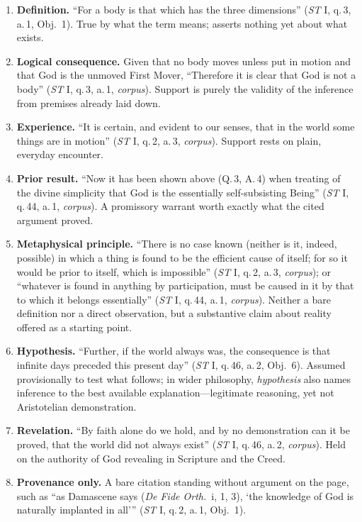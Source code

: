 \begin{enumerate}
\item \textbf{Definition.} ``For a body is that which has the three dimensions'' (\emph{ST} I, q.\,3, a.\,1, Obj.\ 1). True by what the term means; asserts nothing yet about what exists.
\item \textbf{Logical consequence.} Given that no body moves unless put in motion and that God is the unmoved First Mover, ``Therefore it is clear that God is not a body'' (\emph{ST} I, q.\,3, a.\,1, \emph{corpus}). Support is purely the validity of the inference from premises already laid down.
\item \textbf{Experience.} ``It is certain, and evident to our senses, that in the world some things are in motion'' (\emph{ST} I, q.\,2, a.\,3, \emph{corpus}). Support rests on plain, everyday encounter.
\item \textbf{Prior result.} ``Now it has been shown above (Q.\,3, A.\,4) when treating of the divine simplicity that God is the essentially self-subsisting Being'' (\emph{ST} I, q.\,44, a.\,1, \emph{corpus}). A promissory warrant worth exactly what the cited argument proved.
\item \textbf{Metaphysical principle.} ``There is no case known (neither is it, indeed, possible) in which a thing is found to be the efficient cause of itself; for so it would be prior to itself, which is impossible'' (\emph{ST} I, q.\,2, a.\,3, \emph{corpus}); or ``whatever is found in anything by participation, must be caused in it by that to which it belongs essentially'' (\emph{ST} I, q.\,44, a.\,1, \emph{corpus}). Neither a bare definition nor a direct observation, but a substantive claim about reality offered as a starting point.
\item \textbf{Hypothesis.} ``Further, if the world always was, the consequence is that infinite days preceded this present day'' (\emph{ST} I, q.\,46, a.\,2, Obj.\ 6). Assumed provisionally to test what follows; in wider philosophy, \emph{hypothesis} also names inference to the best available explanation---legitimate reasoning, yet not Aristotelian demonstration.
\item \textbf{Revelation.} ``By faith alone do we hold, and by no demonstration can it be proved, that the world did not always exist'' (\emph{ST} I, q.\,46, a.\,2, \emph{corpus}). Held on the authority of God revealing in Scripture and the Creed.
\item \textbf{Provenance only.} A bare citation standing without argument on the page, such as ``as Damascene says (\emph{De Fide Orth.}\ i, 1, 3), `the knowledge of God is naturally implanted in all''' (\emph{ST} I, q.\,2, a.\,1, Obj.\ 1).
\end{enumerate}


